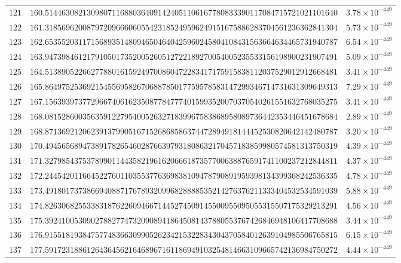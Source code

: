 \documentclass[12pt,reqno]{amsart}
\theoremstyle{remark}
\begin{document}
\begin{longtable}{clc}
$121$ & $160.5144630821309807116880364091424051106167780833390117084715721021101640$ & $3.78\times 10^{-449}$ \\
$122$ & $161.3185696200879720966606055423185249596249151675886283704561236362841304$ & $5.73\times 10^{-449}$ \\
$123$ & $162.6535520311715689351480946504640425960245804108431563664634465731940787$ & $6.54\times 10^{-449}$ \\
$124$ & $163.9473984612179105017352005260512722189270054005235533156198900231907491$ & $5.09\times 10^{-449}$ \\
$125$ & $164.5138905226627788016159249700860472283417175915838112037529012912668481$ & $3.41\times 10^{-449}$ \\
$126$ & $165.8649752536921545569582670688785017759578583147299346714731631309649313$ & $7.29\times 10^{-449}$ \\
$127$ & $167.1563939737729667406162350877847774015993520070370540261551632768035275$ & $3.41\times 10^{-449}$ \\
$128$ & $168.0815286003563591227954005263271839967583868958089736442353446451678684$ & $2.89\times 10^{-449}$ \\
$129$ & $168.8713692120623913799051671526868586374472894918144452530820642142480787$ & $3.20\times 10^{-449}$ \\
$130$ & $170.4945656894738917826546028766397931808632170457183859980574581313750319$ & $4.39\times 10^{-449}$ \\
$131$ & $171.3279854375378990114435821961620666187357700638876591741100237212844811$ & $4.37\times 10^{-449}$ \\
$132$ & $172.2445420116645227601103553776369838109478790891959398134399368242536335$ & $4.78\times 10^{-449}$ \\
$133$ & $173.4918017373866940887176789320996828888535214276376211333404532534591039$ & $5.88\times 10^{-449}$ \\
$134$ & $174.8263068255338318762260946671445274509145500955095055315507175329213291$ & $4.56\times 10^{-449}$ \\
$135$ & $175.3924100530902788277473209089418645081437880553767426846948106417708688$ & $3.44\times 10^{-449}$ \\
$136$ & $176.9155181938475774836630990526234215322834304370584012639104985506765815$ & $6.15\times 10^{-449}$ \\
$137$ & $177.5917231886126436456216468967161186949103254814663109665742136984750272$ & $4.44\times 10^{-449}$ \\

\end{longtable}
\end{document}
